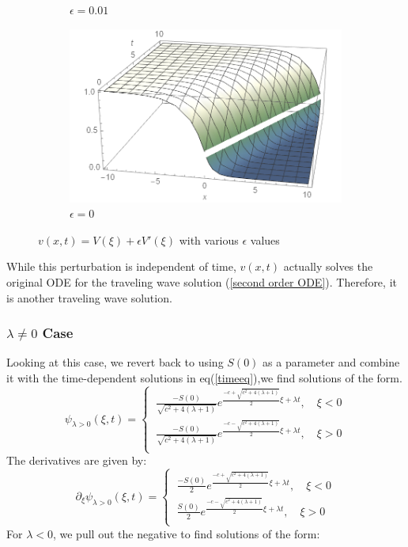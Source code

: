 \documentclass[12pt]{article}
\begin{document}
\begin{figure}[H]
\begin{subfigure}[h]{0.4\textwidth}
        \caption{$\epsilon=0.01$}
        \label{fig:t10}
    \end{subfigure}
    \begin{subfigure}[h]{0.4\textwidth}
        \includegraphics[width=\textwidth]{Part2Plots/e0}
        \caption{$\epsilon=0$}
        \label{fig:e0}
    \end{subfigure}
    \caption{$v(x,t) = V(\xi) + \epsilon V'(\xi)$ with various $\epsilon$ values}\label{fig:timeplots}
\end{figure}

While this perturbation is independent of time, $v(x,t)$ actually solves the original ODE for the traveling wave solution (\ref{second order ODE}). Therefore, it is another traveling wave solution.

\subsubsection{$\lambda \neq 0$ Case}
Looking at this case, we revert back to using $S(0)$ as a parameter and combine it with the time-dependent solutions in eq(\ref{timeeq}),we find  solutions of the form.
\begin{equation}\label{solnlambda+}
\psi_{\lambda >0}(\xi,t)=
\begin{cases}
\ \frac{-S(0)}{\sqrt{c^2+4(\lambda+1)}}e^{\frac{-c+\sqrt{c^2+4(\lambda+1)}}{2}\xi+\lambda t},\quad \xi < 0 \\
\ \frac{-S(0)}{\sqrt{c^2+4(\lambda+1)}}e^{\frac{-c-\sqrt{c^2+4(\lambda+1)}}{2}\xi+\lambda t},\quad \xi > 0\\
\end{cases}
\end{equation}
The derivatives are given by:
\begin{equation}\label{solndevlambda+}
\partial_{\xi} \psi_{\lambda >0}(\xi,t)=
\begin{cases}
\ \frac{-S(0)}{2}e^{\frac{-c+\sqrt{c^2+4(\lambda+1)}}{2}\xi+\lambda t},\quad \xi < 0 \\
\ \frac{S(0)}{2}e^{\frac{-c-\sqrt{c^2+4(\lambda+1)}}{2}\xi+\lambda t},\quad \xi > 0\\
\end{cases}
\end{equation}
For $\lambda < 0$, we pull out the negative to find solutions of the form:
\end{document}

